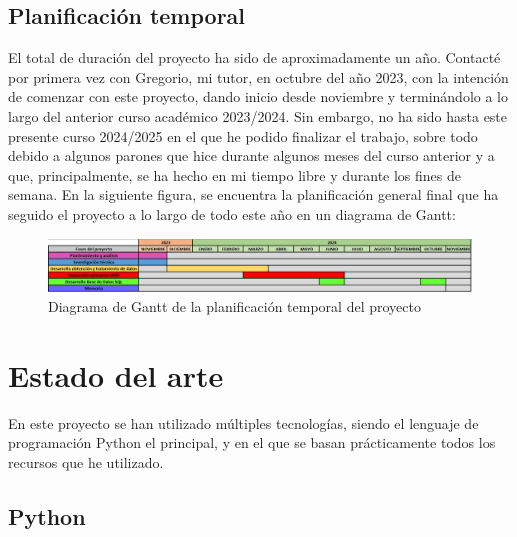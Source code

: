 \documentclass[a4paper, 12pt]{book}
\begin{document}
\section{Planificación temporal}
\label{sec:planificacion-temporal}

El total de duración del proyecto ha sido de aproximadamente un año. Contacté por primera vez con Gregorio, mi tutor, en octubre del año 2023, con la intención de comenzar con este proyecto, dando inicio desde noviembre y terminándolo a lo largo del anterior curso académico 2023/2024. Sin embargo, no ha sido hasta este presente curso 2024/2025 en el que he podido finalizar el trabajo, sobre todo debido a algunos parones que hice durante algunos meses del curso anterior y a que, principalmente, se ha hecho en mi tiempo libre y durante los fines de semana. En la siguiente figura, se encuentra la planificación general final que ha seguido el proyecto a lo largo de todo este año en un diagrama de Gantt:

\begin{figure}[H]
  \centering
  \includegraphics[width=1\textwidth]{img/diagramagantt.png}
  \caption{Diagrama de Gantt de la planificación temporal del proyecto}
    \label{figura:diagrama}
\end{figure}


\cleardoublepage
\chapter{Estado del arte}
\label{chap:estado}

En este proyecto se han utilizado múltiples tecnologías, siendo el lenguaje de programación Python el principal, y en el que se basan prácticamente todos los recursos que he utilizado.

\section{Python}
\label{sec:Python}
\end{document}

